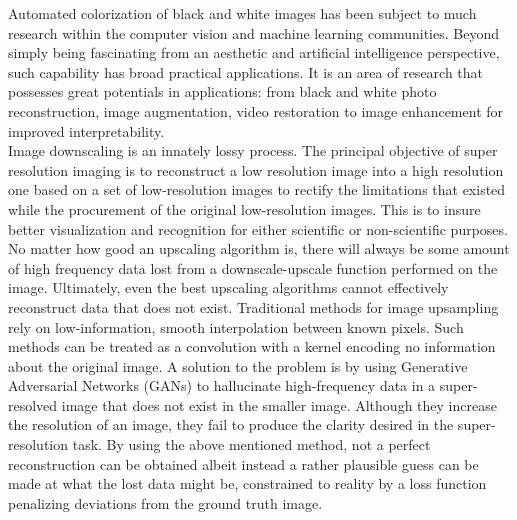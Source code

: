 \documentclass[oneside,a4paper,12pt]{report}
\begin{document}
\newpage

\setcounter{page}{0}
\frontmatter
{}
\rfoot{\thepage}


{   \setlength{\parindent}{11mm} }
{ \setlength{\parindent}{0mm} }
\hspace*{0.25 in}Automated colorization of black and white images has been subject to much research within the computer vision and machine learning communities. Beyond simply being fascinating from an aesthetic and artificial intelligence perspective, such capability has broad practical applications. It is an area of research that possesses great potentials in applications: from black and white photo reconstruction, image augmentation, video restoration to image enhancement for improved interpretability.\\
\hspace*{0.25 in}Image downscaling is an innately lossy process. The principal objective of super resolution imaging is to reconstruct a low resolution image into a high resolution one based on a set of low-resolution images to rectify the limitations that existed while the procurement of the original low-resolution images. This is to insure better visualization and recognition for either scientific or non-scientific purposes. No matter how good an upscaling algorithm is, there will always be some amount of high frequency data lost from a downscale-upscale function performed on the image. Ultimately, even the best upscaling algorithms cannot effectively reconstruct data that does not exist. Traditional methods for image upsampling rely on low-information, smooth interpolation between known pixels. Such methods can be treated as a convolution with a kernel encoding no information about the original image. A solution to the problem is by using Generative Adversarial Networks (GANs) to hallucinate high-frequency data in a super-resolved image that does not exist in the smaller image. Although they increase the resolution of an image, they fail to produce the clarity desired in the super-resolution task. By using the above mentioned method, not a perfect reconstruction can be obtained albeit instead a rather plausible guess can be made at what the lost data might be, constrained to reality by a loss function penalizing deviations from the ground truth image.
\end{document}
